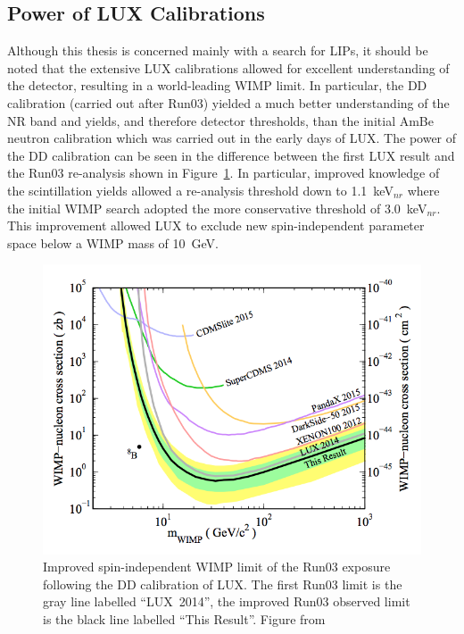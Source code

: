 \subsection{Power of LUX Calibrations}
Although this thesis is concerned mainly with a search for \ac{LIP}s, it should be noted that the extensive \ac{LUX} calibrations allowed for excellent understanding of the detector, resulting in a world-leading \ac{WIMP} limit. In particular, the \ac{DD} calibration (carried out after Run03) yielded a much better understanding of the \ac{NR} band and yields, and therefore detector thresholds, than the initial AmBe neutron calibration which was carried out in the early days of \ac{LUX}. The power of the \ac{DD} calibration can be seen in the difference between the first \ac{LUX} result \cite{LUXFirstResults} and the Run03 re-analysis \cite{LUXReanalysis} shown in Figure~\ref{fig:lux_reanalysis}. In particular, improved knowledge of the scintillation yields allowed a re-analysis threshold down to 1.1~keV$_{nr}$ where the initial \ac{WIMP} search adopted the more conservative threshold of 3.0~keV$_{nr}$. This improvement allowed \ac{LUX} to exclude new spin-independent parameter space below a \ac{WIMP} mass of 10~GeV. 


\begin{figure}[htbp]
\begin{center}
\includegraphics[width=\textwidth]{figures/lux/lux_reanalysis.png}
\caption{Improved spin-independent \ac{WIMP} limit of the Run03 exposure following the \ac{DD} calibration of \ac{LUX}. The first Run03 limit is the gray line labelled ``LUX~2014'', the improved Run03 observed limit is the black line labelled ``This Result''.  Figure from \cite{LUXReanalysis}}
\label{fig:lux_reanalysis}
\end{center}
\end{figure}




